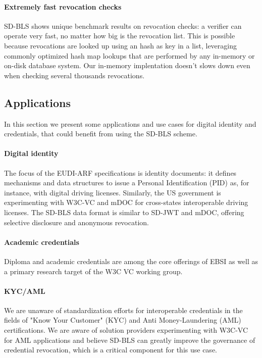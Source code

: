 \paragraph{Extremely fast revocation checks}
SD-BLS shows unique benchmark results on revocation checks: a verifier
can operate very fast, no matter how big is the revocation list. This
is possible because revocations are looked up using an hash as key in
a list, leveraging commonly optimized hash map lookups that are
performed by any in-memory or on-disk database system. Our in-memory
implentation doesn't slows down even when checking several thousands
revocations.

\subsection{Applications}
In this section we present some applications and use cases for digital
identity and credentials, that could benefit from using the SD-BLS
scheme.

\paragraph{Digital identity}
The focus of the EUDI-ARF specifications is identity documents: it
defines mechanisms and data structures to issue a Personal
Identification (PID) as, for instance, with digital driving
licenses. Similarly, the US government is experimenting with W3C-VC
and mDOC for cross-states interoperable driving licenses. The SD-BLS
data format is similar to SD-JWT and mDOC, offering selective
disclosure and anonymous revocation.

\paragraph{Academic credentials}
Diploma and academic credentials are among the core offerings of EBSI
as well as a primary research target of the W3C VC working group.

\paragraph{KYC/AML}
We are unaware of standardization efforts for interoperable
credentials in the fields of "Know Your Customer" (KYC) and Anti
Money-Laundering (AML) certifications. We are aware of solution
providers experimenting with W3C-VC for AML applications and believe
SD-BLS can greatly improve the governance of credential revocation,
which is a critical component for this use case.

